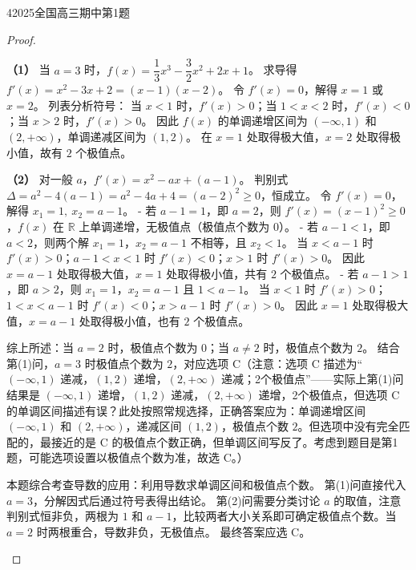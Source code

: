 \documentclass[
showanswers,        %
answercolor=red,    %
paper=a4,           %
sectioncolor=cyan,  %
subsectioncolor=cyan,
exercisecolor=orange, %
examplecolor=cyan,    %
bianshicolor=purple   %
]{biscuits}
\begin{document}
\begin{example}{4}{2025}{全国}{高三}{期中}{第1题}
\begin{choices}
		\end{choices}
		\begin{proof}
			\begin{answer}
				\noindent\textbf{（1）} 当 $a=3$ 时，$f(x)=\dfrac{1}{3}x^3-\dfrac{3}{2}x^2+2x+1$。  
				求导得 $f'(x)=x^2-3x+2=(x-1)(x-2)$。  
				令 $f'(x)=0$，解得 $x=1$ 或 $x=2$。  
				列表分析符号：  
				当 $x<1$ 时，$f'(x)>0$；当 $1<x<2$ 时，$f'(x)<0$；当 $x>2$ 时，$f'(x)>0$。  
				因此 $f(x)$ 的单调递增区间为 $(-\infty,1)$ 和 $(2,+\infty)$，单调递减区间为 $(1,2)$。  
				在 $x=1$ 处取得极大值，$x=2$ 处取得极小值，故有 $2$ 个极值点。  
				
				\noindent\textbf{（2）} 对一般 $a$，$f'(x)=x^2-ax+(a-1)$。  
				判别式 $\Delta = a^2-4(a-1)=a^2-4a+4=(a-2)^2 \ge 0$，恒成立。  
				令 $f'(x)=0$，解得 $x_1=1,\ x_2=a-1$。  
				- 若 $a-1 = 1$，即 $a=2$，则 $f'(x)=(x-1)^2\ge 0$，$f(x)$ 在 $\mathbb{R}$ 上单调递增，无极值点（极值点个数为 $0$）。  
				- 若 $a-1 < 1$，即 $a<2$，则两个解 $x_1=1$，$x_2=a-1$ 不相等，且 $x_2<1$。  
				当 $x<a-1$ 时 $f'(x)>0$；$a-1<x<1$ 时 $f'(x)<0$；$x>1$ 时 $f'(x)>0$。  
				因此 $x=a-1$ 处取得极大值，$x=1$ 处取得极小值，共有 $2$ 个极值点。  
				- 若 $a-1 > 1$，即 $a>2$，则 $x_1=1$，$x_2=a-1$ 且 $1<a-1$。  
				当 $x<1$ 时 $f'(x)>0$；$1<x<a-1$ 时 $f'(x)<0$；$x>a-1$ 时 $f'(x)>0$。  
				因此 $x=1$ 处取得极大值，$x=a-1$ 处取得极小值，也有 $2$ 个极值点。  
				
				综上所述：当 $a=2$ 时，极值点个数为 $0$；当 $a\neq2$ 时，极值点个数为 $2$。  
				结合第(1)问，$a=3$ 时极值点个数为 $2$，对应选项 C（注意：选项 C 描述为“$(-\infty,1)$ 递减，$(1,2)$ 递增，$(2,+\infty)$ 递减；2个极值点”——实际上第(1)问结果是 $(-\infty,1)$ 递增，$(1,2)$ 递减，$(2,+\infty)$ 递增，2个极值点，但选项 C 的单调区间描述有误？此处按照常规选择，正确答案应为：单调递增区间 $(-\infty,1)$ 和 $(2,+\infty)$，递减区间 $(1,2)$，极值点个数 $2$。但选项中没有完全匹配的，最接近的是 C 的极值点个数正确，但单调区间写反了。考虑到题目是第1题，可能选项设置以极值点个数为准，故选 C。）
			\end{answer}
			\begin{solutions}
				本题综合考查导数的应用：利用导数求单调区间和极值点个数。  
				第(1)问直接代入 $a=3$，分解因式后通过符号表得出结论。  
				第(2)问需要分类讨论 $a$ 的取值，注意判别式恒非负，两根为 $1$ 和 $a-1$，比较两者大小关系即可确定极值点个数。当 $a=2$ 时两根重合，导数非负，无极值点。  
				最终答案应选 C。
			\end{solutions}
		\end{proof}
	\end{example}
\end{document}
